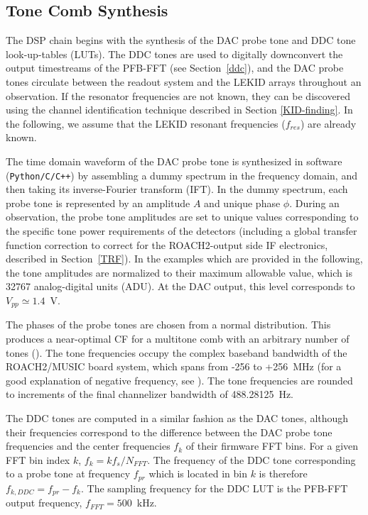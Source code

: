 \subsection{Tone Comb Synthesis}\label{tone comb}

The DSP chain begins with the synthesis of the DAC probe tone and DDC tone look-up-tables (LUTs). The DDC tones are used to digitally downconvert the output timestreams of the PFB-FFT (see Section~\ref{ddc}), and the DAC probe tones circulate between the readout system and the LEKID arrays throughout an observation. If the resonator frequencies are not known, they can be discovered using the channel identification technique described in Section \ref{KID-finding}. In the following, we assume that the LEKID resonant frequencies ($f_{res}$) are already known.

The time domain waveform of the DAC probe tone is synthesized in software (\texttt{Python/C/C++}) by assembling a dummy spectrum in the frequency domain, and then taking its inverse-Fourier transform (IFT). In the dummy spectrum, each probe tone is represented by an amplitude $A$ and unique phase $\phi$. During an observation, the probe tone amplitudes are set to unique values corresponding to the specific tone power requirements of the detectors (including a global transfer function correction to correct for the ROACH2-output side IF electronics, described in Section~\ref{TRF}). In the examples which are provided in the following, the tone amplitudes are normalized to their maximum allowable value, which is 32767 analog-digital units (ADU). At the DAC output, this level corresponds to $V_{pp} \simeq 1.4$~V.

The phases of the probe tones are chosen from a normal distribution. This produces a near-optimal CF for a multitone comb with an arbitrary number of tones (\citet{boyd1986multitone}). The tone frequencies occupy the complex baseband bandwidth of the ROACH2/MUSIC board system, which spans from -256 to +256~MHz (for a good explanation of negative frequency, see \citet{lyons2004understanding}). The tone frequencies are rounded to increments of the final channelizer bandwidth of 488.28125~Hz.

The DDC tones are computed in a similar fashion as the DAC tones, although their frequencies correspond to the difference between the DAC probe tone frequencies and the center frequencies $f_{k}$ of their firmware FFT bins. For a given FFT bin index $k$, $f_{k} = kf_{s}/N_{FFT}$. The frequency of the DDC tone corresponding to a probe tone at frequency $f_{pr}$ which is located in bin $k$ is therefore $f_{k,DDC} = f_{pr} - f_{k}$. The sampling frequency for the DDC LUT is the PFB-FFT output frequency, $f_{FFT} = 500$~kHz.

